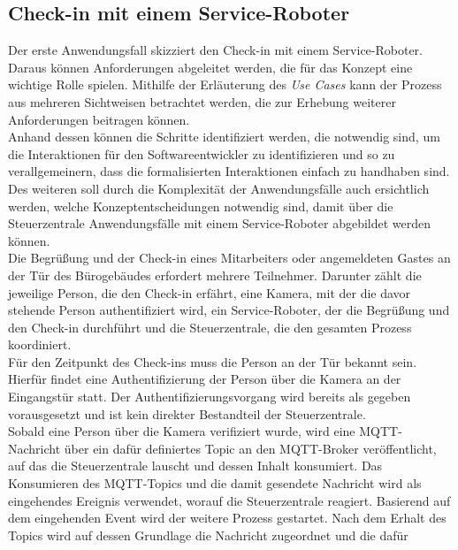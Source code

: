 \subsection{Check-in mit einem Service-Roboter}
\label{subsec:checkin}
    Der erste Anwendungsfall skizziert den Check-in mit einem Service-Roboter. 
    Daraus können Anforderungen abgeleitet werden, die für das Konzept eine wichtige Rolle spielen. Mithilfe der 
    Erläuterung des \textit{Use Cases} kann der Prozess aus mehreren Sichtweisen betrachtet werden, die zur Erhebung weiterer 
    Anforderungen beitragen können. 
    \\ 
    Anhand dessen können die Schritte identifiziert werden, die notwendig sind, um die Interaktionen für den 
    Softwareentwickler zu identifizieren und so zu verallgemeinern, dass die formalisierten Interaktionen einfach zu 
    handhaben sind. Des weiteren soll durch die Komplexität der Anwendungsfälle auch ersichtlich werden, welche 
    Konzeptentscheidungen notwendig sind, damit über die Steuerzentrale Anwendungsfälle mit einem Service-Roboter abgebildet werden 
    können.
    \\
    \linebreak
    Die Begrüßung und der Check-in eines Mitarbeiters oder angemeldeten Gastes an der Tür des Bürogebäudes erfordert mehrere Teilnehmer. 
    Darunter zählt die jeweilige Person, die den Check-in erfährt, eine Kamera, mit der die davor stehende Person authentifiziert wird, 
    ein Service-Roboter, der die Begrüßung und den Check-in durchführt und die Steuerzentrale, die den gesamten Prozess koordiniert. 
    \\
    \linebreak
    Für den Zeitpunkt des Check-ins muss die Person an 
    der Tür bekannt sein. Hierfür findet eine Authentifizierung der Person über die Kamera an der Eingangstür statt. Der 
    Authentifizierungsvorgang wird bereits als gegeben vorausgesetzt und ist kein direkter Bestandteil der Steuerzentrale. 
    \\
    Sobald eine Person über die Kamera verifiziert wurde, wird eine \acs{MQTT}-Nachricht über ein dafür definiertes Topic 
    an den \acs{MQTT}-Broker veröffentlicht, 
    auf das die Steuerzentrale lauscht und dessen Inhalt konsumiert. Das Konsumieren des \acs{MQTT}-Topics und die damit gesendete 
    Nachricht wird als eingehendes Ereignis verwendet, worauf die Steuerzentrale reagiert. Basierend auf dem eingehenden Event wird der 
    weitere Prozess gestartet. Nach dem Erhalt des Topics wird auf dessen Grundlage die Nachricht zugeordnet und die dafür 
